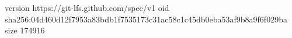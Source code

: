 version https://git-lfs.github.com/spec/v1
oid sha256:04d460d12f7953a83bdb1f7535173c31ac58c1c45db0eba53af9b8a9f6f029ba
size 174916
